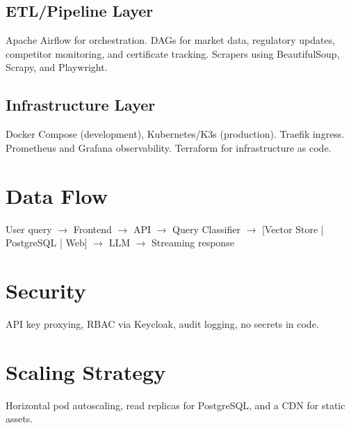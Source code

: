 \documentclass{article}
\begin{document}
\subsection{ETL/Pipeline Layer}

Apache Airflow for orchestration. DAGs for market data, regulatory updates, competitor monitoring, and certificate tracking. Scrapers using BeautifulSoup, Scrapy, and Playwright.

\subsection{Infrastructure Layer}

Docker Compose (development), Kubernetes/K3s (production). Traefik ingress. Prometheus and Grafana observability. Terraform for infrastructure as code.

\section{Data Flow}

User query $\rightarrow$ Frontend $\rightarrow$ API $\rightarrow$ Query Classifier $\rightarrow$ [Vector Store | PostgreSQL | Web] $\rightarrow$ LLM $\rightarrow$ Streaming response

\section{Security}

API key proxying, RBAC via Keycloak, audit logging, no secrets in code.

\section{Scaling Strategy}

Horizontal pod autoscaling, read replicas for PostgreSQL, and a CDN for static assets.
\end{document}
